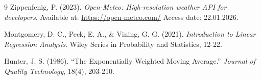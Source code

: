 \documentclass[14pt]{extarticle}
\begin{document}

\newpage

\begin{thebibliography}{9}
Zippenfenig, P. (2023). \textit{Open-Meteo: High-resolution weather API for developers}. Available at: \url{https://open-meteo.com/} Access date: 22.01.2026.

Montgomery, D. C., Peck, E. A., \& Vining, G. G. (2021). \textit{Introduction to Linear Regression Analysis}. Wiley Series in Probability and Statistics, 12-22.

Hunter, J. S. (1986). ``The Exponentially Weighted Moving Average.'' \textit{Journal of Quality Technology}, 18(4), 203-210.
\end{thebibliography}
\end{document}
